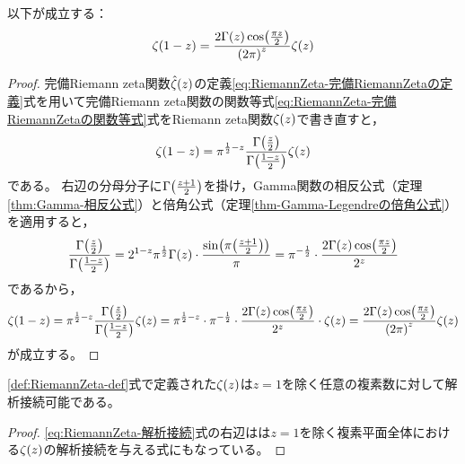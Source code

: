 \documentclass[a4paper,draft]{ltjsarticle}
\begin{document}
\begin{thm}
    以下が成立する：
    \begin{equation}
        \fun{\zeta}{1-z}=\frac{2\fun{\Gamma}{z}\fun{\cos}{\frac{\pi z}{2}}}{\pare{2\pi}^z}\fun{\zeta}{z}
        \label{eq:RiemannZeta-解析接続}
    \end{equation}
    \begin{proof}
        完備Riemann zeta関数$\fun{\hat{\zeta}}{z}$の定義\eqref{eq:RiemannZeta-完備RiemannZetaの定義}式を用いて完備Riemann zeta関数の関数等式\eqref{eq:RiemannZeta-完備RiemannZetaの関数等式}式をRiemann zeta関数$\fun{\zeta}{z}$で書き直すと，
        \begin{equation}
            \fun{\zeta}{1-z}=\pi^{\frac{1}{2}-z}\frac{\fun{\Gamma}{\frac{z}{2}}}{\fun{\Gamma}{\frac{1-z}{2}}}\fun{\zeta}{z}
        \end{equation}
        である。
        右辺の分母分子に$\fun{\Gamma}{\frac{z+1}{2}}$を掛け，Gamma関数の相反公式（定理\ref{thm:Gamma-相反公式}）と倍角公式（定理\ref{thm-Gamma-Legendreの倍角公式}）を適用すると，
        \begin{equation}
            \frac{\fun{\Gamma}{\frac{z}{2}}}{\fun{\Gamma}{\frac{1-z}{2}}}
            =2^{1-z}\pi^{\frac{1}{2}}\fun{\Gamma}{z}\cdot \frac{\fun{\sin}{\pi\pare{\frac{z+1}{2}}}}{\pi}
            =\pi^{-\frac{1}{2}}\cdot \frac{2\fun{\Gamma}{z}\fun{\cos}{\frac{\pi z}{2}}}{2^z}
        \end{equation}
        であるから，
        \begin{equation}
            \fun{\zeta}{1-z}=\pi^{\frac{1}{2}-z}\frac{\fun{\Gamma}{\frac{z}{2}}}{\fun{\Gamma}{\frac{1-z}{2}}}\fun{\zeta}{z}
            =\pi^{\frac{1}{2}-z}\cdot \pi^{-\frac{1}{2}}\cdot \frac{2\fun{\Gamma}{z}\fun{\cos}{\frac{\pi z}{2}}}{2^z}\cdot \fun{\zeta}{z}
            =\frac{2\fun{\Gamma}{z}\fun{\cos}{\frac{\pi z}{2}}}{\pare{2\pi}^z}\fun{\zeta}{z}
        \end{equation}
        が成立する。
    \end{proof}
\end{thm}

\begin{thm}
    \eqref{def:RiemannZeta-def}式で定義された$\fun{\zeta}{z}$は$z=1$を除く任意の複素数に対して解析接続可能である。
    \begin{proof}
        \eqref{eq:RiemannZeta-解析接続}式の右辺はは$z=1$を除く複素平面全体における$\fun{\zeta}{z}$の解析接続を与える式にもなっている。
    \end{proof}
\end{thm}
\fi
\end{document}
